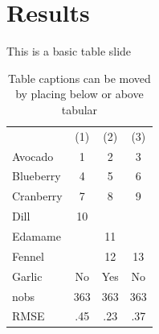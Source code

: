 \documentclass[usenames,dvipsnames]{beamer}
\begin{document}
\section{Results}

\begin{frame}{This is a basic table slide}
    \centering
    \begin{table}
    \centering
    \begin{tabular}{lccc}
        & (1) & (2) & (3) \\ \cline{2-4} 
        Avocado & 1 & 2 &  3\\
        Blueberry & 4 & 5 & 6 \\
        Cranberry & 7 & 8 & 9 \\
        Dill & 10 &  &  \\
        Edamame &  & 11 &  \\
        Fennel &  & 12 & 13 \\
        Garlic & No & Yes & No \\ \hline
        nobs & 363 & 363 & 363 \\
        RMSE & .45 & .23 & .37
    \end{tabular}
    \caption{Table captions can be moved by placing below or above tabular}
    \end{table}  
\end{frame}
\end{document}
